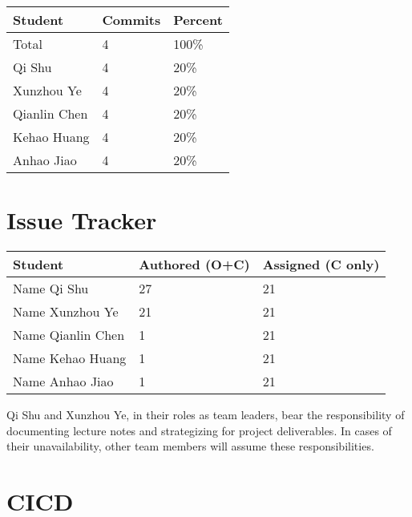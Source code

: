 \documentclass{article}
\begin{document}
\begin{table}[H]
\centering
\begin{tabular}{lll}
\toprule
\textbf{Student} & \textbf{Commits} & \textbf{Percent}\\
\midrule
Total & 4 & 100\% \\
Qi Shu & 4 & 20\% \\
Xunzhou Ye & 4 & 20\% \\
Qianlin Chen & 4 & 20\% \\
Kehao Huang & 4 & 20\% \\
Anhao Jiao & 4 & 20\% \\
\bottomrule
\end{tabular}
\end{table}



\section{Issue Tracker}


\begin{table}[H]
\centering
\begin{tabular}{lll}
\toprule
\textbf{Student} & \textbf{Authored (O+C)} & \textbf{Assigned (C only)}\\
\midrule
Name Qi Shu & 27 & 21 \\
Name Xunzhou Ye & 21 & 21 \\
Name Qianlin Chen & 1 & 21 \\
Name Kehao Huang & 1 & 21 \\
Name Anhao Jiao & 1 & 21 \\
\bottomrule
\end{tabular}
\end{table}


Qi Shu and Xunzhou Ye, in their roles as team leaders, bear the responsibility of 
documenting lecture notes and strategizing for project deliverables. In cases 
of their unavailability, other team members will assume these responsibilities.

\section{CICD}

\end{document}
